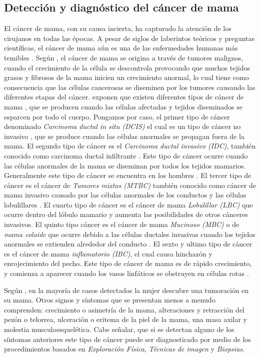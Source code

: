 \subsection{Detección y diagnóstico del cáncer de mama}
El cáncer de mama, con su causa incierta, ha capturado la atención de los cirujanos en todas las épocas. A pesar de siglos de laberintos teóricos y preguntas científicas, el cáncer de mama aún es una de las enfermedades humanas más temibles \cite{Bland2009}. Según \cite{Fatima2020}, el cáncer de mama se origina a través de tumores malignos, cuando el crecimiento de la célula se descontrola provocando que muchos tejidos grasos y fibrosos de la mama inicien un crecimiento anormal, lo cual tiene como consecuencia que las células cancerosas se diseminen por los tumores causando las diferentes etapas del cáncer. \cite{Fatima2020} exponen que existen diferentes tipos de cáncer de mama \cite{Sun2017}, que se producen cuando las células afectadas y tejidos diseminados se esparcen por todo el cuerpo. Pongamos por caso, el primer tipo de cáncer denominado \textit{Carcinoma ductal in situ (DCIS)} el cual es un tipo de cáncer no invasivo \cite{Hou2020}, que se produce cuando las células anormales se propagan fuera de la mama. El segundo tipo de cáncer es el \textit{Carcinoma ductal invasivo (IDC)}, también conocido como carcinoma ductal infiltrante \cite{Chaudhury2011}. Este tipo de cáncer ocurre cuando las células anormales de la mama se diseminan por todos los tejidos mamarios. Generalmente este tipo de cáncer se encuentra en los hombres \cite{Page1982}. El tercer tipo de cáncer es el cáncer de \textit{Tumores mixtos (MTBC)} también conocido como cáncer de mama invasivo \cite{Tuck1997} causado por las células anormales de los conductos y las células lobulillares \cite{Lee2017}. El cuarto tipo de cáncer es el cáncer de mama \textit{Lobulillar (LBC)} \cite{Masciari2007} que ocurre dentro del lóbulo mamario y aumenta las posibilidades de otros cánceres invasivos. El quinto tipo cáncer es el cáncer de mama \textit{Mucinoso (MBC)} o de \textit{mama coloide} \cite{Memis2000} que ocurre debido a las células ductales invasivas cuando los tejidos anormales se extienden alrededor del conducto \cite{Gradilone2011}. El sexto y ultimo tipo de cáncer es el cáncer de mama \textit{inflamatorio (IBC)}, el cual causa hinchazón y enrojecimiento del pecho. Este tipo de cáncer de mama es de rápido crecimiento, y comienza a aparecer cuando los vasos linfáticos se obstruyen en células rotas \cite{Robertson2010}.

Según \cite{Brunicardi2010}, en la mayoría de casos detectados la mujer descubre una tumoración en su mama. Otros signos y síntomas que se presentan menos a menudo comprenden: crecimiento o asimetría de la mama, alteraciones y retracción del pezón o telorrea, ulceración o eritema de la piel de la mama, una masa axilar y molestia musculoesquelética. Cabe señalar, que si se detectan alguno de los síntomas anteriores este tipo de cáncer puede ser diagnosticado por medio de los procedimientos basados en \textit{Exploración Física}, \textit{Técnicas de imagen} y \textit{Biopsias}. 

